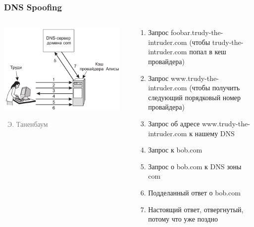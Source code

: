 \documentclass[xetex,mathserif,serif]{beamer}
\newcommand{\attribution}[1] {
\vspace{-5mm}\begin{flushright}\begin{scriptsize}\textcolor{gray}{\textcopyright\, #1}\end{scriptsize}\end{flushright}
}
\begin{document}
	\begin{frame}
		\frametitle{DNS Spoofing}
		\begin{columns}
			\begin{column}{0.4\textwidth}
				\includegraphics[width=0.95\textwidth]{dnsSpoofing.png}
				\attribution{Э. Таненбаум}
			\end{column}
			\begin{column}{0.6\textwidth}
				\begin{footnotesize}
					\begin{enumerate}
						\item Запрос foobar.trudy-the-intruder.com (чтобы trudy-the-intruder.com попал в кеш провайдера)
						\item Запрос www.trudy-the-intruder.com (чтобы получить следующий порядковый номер провайдера)
						\item Запрос об адресе www.trudy-the-intruder.com к нашему DNS
						\item Запрос к bob.com
						\item Запрос о bob.com к DNS зоны com
						\item Подделанный ответ о bob.com
						\item Настоящий ответ, отвергнутый, потому что уже поздно
					\end{enumerate}
				\end{footnotesize}
			\end{column}
		\end{columns}
	\end{frame}
\end{document}
